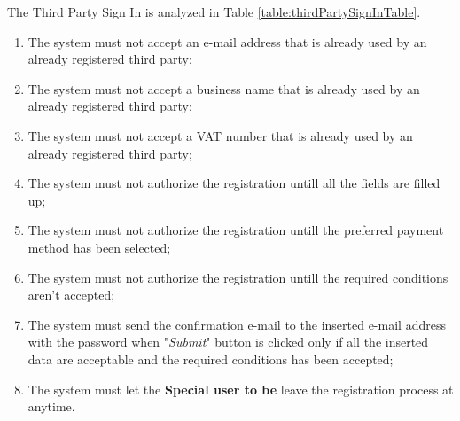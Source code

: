 The Third Party Sign In is analyzed in Table \ref{table:thirdPartySignInTable}.

\begin{enumerate}
  \item The system must not accept an e-mail address that is already used by an already registered third party;
  \item The system must not accept a business name that is already used by an already registered third party;
  \item The system must not accept a VAT number that is already used by an already registered third party;
  \item The system must not authorize the registration untill all the fields are filled up;
  \item The system must not authorize the registration untill the preferred payment method has been selected;
  \item The system must not authorize the registration untill the required conditions aren't accepted;
  \item The system must send the confirmation e-mail to the inserted e-mail address with the password when "\textit{Submit}" button is clicked only if all the inserted data are acceptable and the required conditions has been accepted;
  \item The system must let the \textbf{Special user to be} leave the registration process at anytime.
\end{enumerate}

